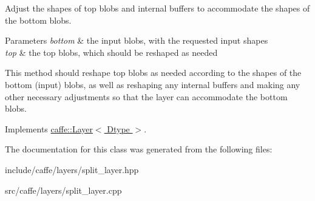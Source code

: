 Adjust the shapes of top blobs and internal buffers to accommodate the shapes of the bottom blobs. 


\begin{DoxyParams}{Parameters}
{\em bottom} & the input blobs, with the requested input shapes \\
\hline
{\em top} & the top blobs, which should be reshaped as needed\\
\hline
\end{DoxyParams}
This method should reshape top blobs as needed according to the shapes of the bottom (input) blobs, as well as reshaping any internal buffers and making any other necessary adjustments so that the layer can accommodate the bottom blobs. 

Implements \hyperlink{classcaffe_1_1Layer_ad9d391b972c769c0ebee34ca6d1c973e}{caffe\+::\+Layer$<$ Dtype $>$}.



The documentation for this class was generated from the following files\+:\begin{DoxyCompactItemize}
\item 
include/caffe/layers/split\+\_\+layer.\+hpp\item 
src/caffe/layers/split\+\_\+layer.\+cpp\end{DoxyCompactItemize}
